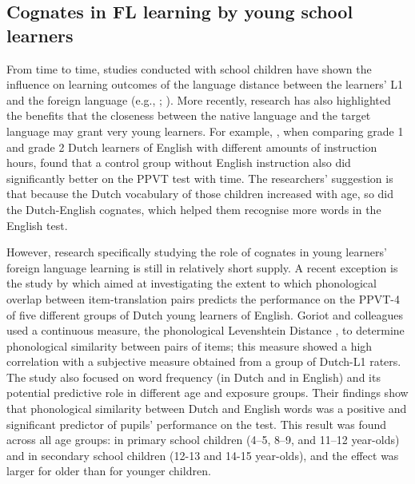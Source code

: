 \documentclass[output=paper,modfonts,nonflat,newtxmath]{langsci/langscibook}
\begin{document}
\subsection{{Cognates} {in} {FL} {learning} {by} {young} {school} {learners}}

{From time to time, studies conducted with school children have shown the influence on learning outcomes of the language distance between the learners’ L1 and the foreign language (e.g., \citealt{BildSwain1989}; \citealt{DYdewallevandePoel1999}). More recently, research has also highlighted the benefits that the closeness between the native language and the target language may grant very young learners. For example, \citet{UnsworthEtAl2015}, when comparing grade 1 and grade 2 Dutch learners of English with different amounts of instruction hours, found that a control group without English instruction also did significantly better on the PPVT test with time. The researchers’ suggestion is that because the Dutch vocabulary of those children increased with age, so did the Dutch-English cognates, which helped them recognise more words in the English test.}

{However, research specifically studying the role of cognates in young learners’ foreign language learning is still in relatively short supply. A recent exception is the study by \citet{GoriotEtAl2018} which aimed at investigating the extent to which phonological overlap between item-translation pairs predicts the performance on the PPVT-4 of five different groups of Dutch young learners of English. Goriot and colleagues used a continuous measure, the phonological Levenshtein Distance \citep{SchepensEtAl2013}, to determine phonological similarity between pairs of items; this measure showed a high correlation with a subjective measure obtained from a group of Dutch-L1 raters. The study also focused on word frequency (in Dutch and in English) and its potential predictive role in different age and exposure groups. Their findings show that phonological similarity between Dutch and English words was a positive and significant predictor of pupils’ performance on the test. This result was found across all age groups: in primary school children (4--5, 8--9, and 11--12 year-olds) and in secondary school children (12-13 and 14-15 year-olds), and the effect was larger for older than for younger children.}
\end{document}
